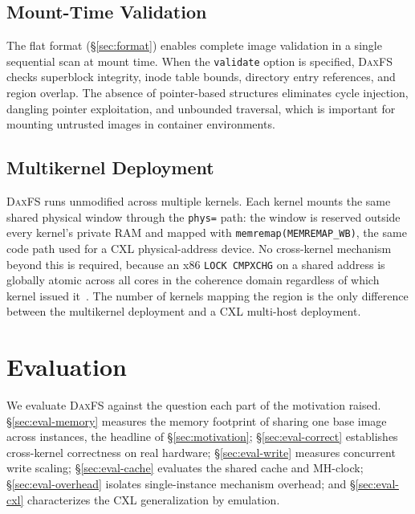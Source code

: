 \documentclass[letterpaper,twocolumn,10pt]{article}
\newcommand{\daxfs}{\textsc{DaxFS}\xspace}
\begin{document}
\subsection{Mount-Time Validation}

The flat format (\S\ref{sec:format}) enables complete image validation
in a single sequential scan at mount time.  When the \texttt{validate}
option is specified, \daxfs checks superblock integrity, inode table
bounds, directory entry references, and region overlap.  The absence
of pointer-based structures eliminates cycle injection, dangling
pointer exploitation, and unbounded traversal, which is important for
mounting untrusted images in container environments.

\subsection{Multikernel Deployment}
\label{sec:multikernel-impl}

\daxfs runs unmodified across multiple kernels.  Each kernel mounts the
same shared physical window through the \texttt{phys=} path: the window
is reserved outside every kernel's private RAM and mapped with
\texttt{memremap(MEMREMAP\_WB)}, the same code path used for a CXL
physical-address device.  No cross-kernel mechanism beyond this is
required, because an x86 \texttt{LOCK CMPXCHG} on a shared address is
globally atomic across all cores in the coherence domain regardless of
which kernel issued it~\cite{intel:sdm}.  The number of kernels mapping
the region is the only difference between the multikernel deployment
and a CXL multi-host deployment.

\section{Evaluation}
\label{sec:evaluation}

We evaluate \daxfs against the question each part of the motivation
raised.  \S\ref{sec:eval-memory} measures the memory footprint of
sharing one base image across instances, the headline of
\S\ref{sec:motivation}; \S\ref{sec:eval-correct} establishes
cross-kernel correctness on real hardware; \S\ref{sec:eval-write}
measures concurrent write scaling; \S\ref{sec:eval-cache} evaluates the
shared cache and MH-clock; \S\ref{sec:eval-overhead} isolates
single-instance mechanism overhead; and \S\ref{sec:eval-cxl}
characterizes the CXL generalization by emulation.
\end{document}
